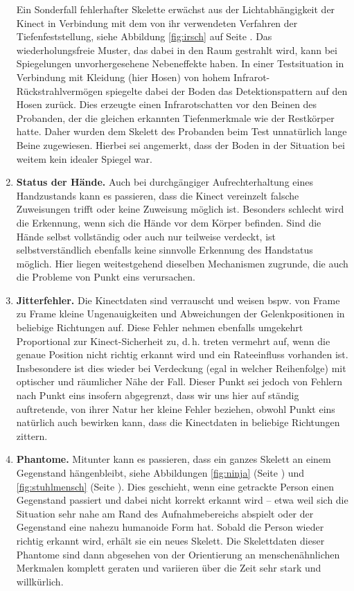 \begin{enumerate}[label=(\roman*)]
\begin{figure}
	\end{figure}
		Ein Sonderfall fehlerhafter Skelette erwächst aus der Lichtabhängigkeit der Kinect in Verbindung mit dem von ihr verwendeten Verfahren der Tiefenfeststellung, siehe Abbildung \ref{fig:irsch} auf Seite \pageref{fig:irsch}. Das wiederholungsfreie Muster, das dabei in den Raum gestrahlt wird, kann bei Spiegelungen unvorhergesehene Nebeneffekte haben. In einer Testsituation in Verbindung mit Kleidung (hier Hosen) von hohem Infrarot-Rückstrahlvermögen spiegelte dabei der Boden das Detektionspattern auf den Hosen zurück. Dies erzeugte einen \glqq{}Infrarotschatten\grqq{} vor den Beinen des Probanden, der die gleichen erkannten Tiefenmerkmale wie der Restkörper hatte. Daher wurden dem Skelett des Probanden beim Test unnatürlich lange Beine zugewiesen. Hierbei sei angemerkt, dass der Boden in der Situation bei weitem kein idealer Spiegel war.\par
		\item\label{itm:problem2} \textbf{Status der Hände.} Auch bei durchgängiger Aufrechterhaltung eines Handzustands kann es passieren, dass die Kinect vereinzelt falsche Zuweisungen trifft oder keine Zuweisung möglich ist. Besonders schlecht wird die Erkennung, wenn sich die Hände vor dem Körper befinden. Sind die Hände selbst vollständig oder auch nur teilweise verdeckt, ist selbstverständlich ebenfalls keine sinnvolle Erkennung des Handstatus möglich. Hier liegen weitestgehend dieselben Mechanismen zugrunde, die auch die Probleme von Punkt eins verursachen.  
		\item\label{itm:problem3} \textbf{Jitterfehler.} Die Kinectdaten sind verrauscht und weisen bspw. von Frame zu Frame kleine Ungenauigkeiten und Abweichungen der Gelenkpositionen in beliebige Richtungen auf. Diese Fehler nehmen ebenfalls umgekehrt Proportional zur Kinect-Sicherheit zu, d.\,h. treten vermehrt auf, wenn die genaue Position nicht richtig erkannt wird und ein \glqq Rateeinfluss\grqq{} vorhanden ist. Insbesondere ist dies wieder bei Verdeckung (egal in welcher Reihenfolge) mit optischer und räumlicher Nähe der Fall. Dieser Punkt sei jedoch von Fehlern nach Punkt eins insofern abgegrenzt, dass wir uns hier auf ständig auftretende, von ihrer Natur her kleine Fehler beziehen, obwohl Punkt eins natürlich auch bewirken kann, dass die Kinectdaten in beliebige Richtungen \glqq zittern\grqq{}.
		\item\label{itm:problem4} \textbf{Phantome.} Mitunter kann es passieren, dass ein ganzes Skelett an einem Gegenstand hängenbleibt, siehe Abbildungen \ref{fig:ninja} (Seite \pageref{fig:ninja}) und \ref{fig:stuhlmensch} (Seite \pageref{fig:stuhlmensch}). Dies geschieht, wenn eine getrackte Person einen Gegenstand passiert und dabei nicht korrekt erkannt wird -- etwa weil sich die Situation sehr nahe am Rand des Aufnahmebereichs abspielt oder der Gegenstand eine nahezu humanoide Form hat. Sobald die Person wieder richtig erkannt wird, erhält sie ein neues Skelett. Die Skelettdaten dieser Phantome sind dann abgesehen von der Orientierung an menschenähnlichen Merkmalen komplett geraten und variieren über die Zeit sehr stark und willkürlich.\par

\end{enumerate}
